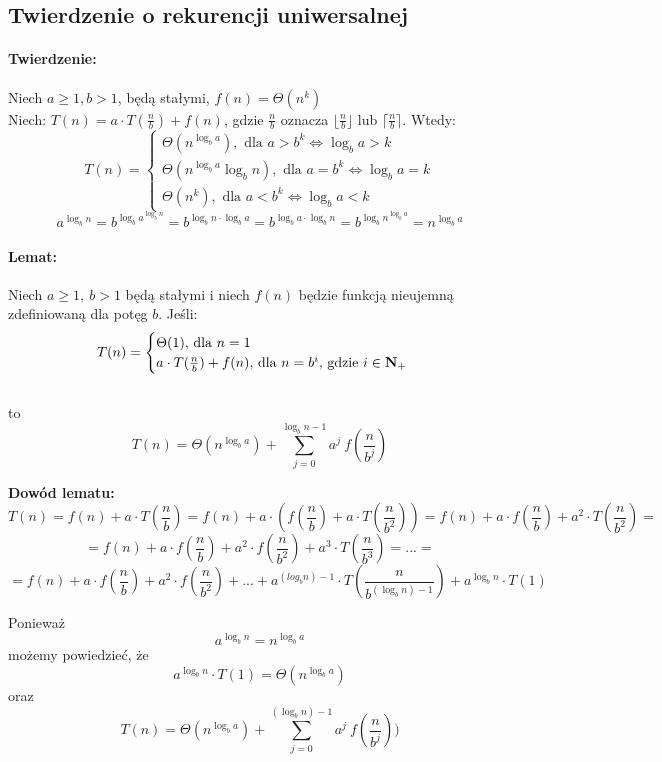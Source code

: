 \subsection{Twierdzenie o rekurencji uniwersalnej}
\paragraph{Twierdzenie:}
Niech $a \geq 1, b > 1$, będą stałymi, $f(n) = \Theta(n^k)$\\
Niech: $T(n) = a \cdot T(\frac{n}{b})+f(n)$, gdzie $\frac{n}{b}$ oznacza $\lfloor \frac{n}{b} \rfloor $ lub $\lceil \frac{n}{b} \rceil$. Wtedy:
$$
  T(n)=\begin{cases}
               \Theta(n^{\log_b a}), \text{ dla } a > b^k \Leftrightarrow \log_b a>k\\
               \Theta(n^{\log_b a} \log_b n), \text{ dla } a=b^k \Leftrightarrow \log_b a=k\\
               \Theta(n^k), \text{ dla } a<b^k \Leftrightarrow \log_b a<k
		\end{cases}
$$
$$a^{\log_b n}=b^{\log_b a^{\log_b n}}=b^{\log_b n \cdot \log_b a}=b^{\log_b a \cdot \log_b n}=b^{\log_b n^{\log_b a}}=n^{\log_b a}$$

\paragraph{Lemat: }Niech $a\geq 1,\ b>1$ będą stałymi i niech $f(n)$ będzie funkcją nieujemną zdefiniowaną dla potęg $b$.
Jeśli: 
\[
T(n)=\begin{cases}
	\Theta(1), $ dla $ n=1 \\
    a \cdot T(\frac{n}{b}) + f(n),$ dla $ n=b^i, $ gdzie $i \in \mathbf{N}_+
\end{cases}
\]\\
to\
$$T(n) = \Theta(n^{\log_b a}) + \sum_{j=0}^{\log_b n-1} a^j\ f(\frac{n}{b^j})$$

\textbf{Dowód lematu: }
$$T(n)= f(n) + a \cdot T(\frac{n}{b})= f(n) + a \cdot (f(\frac{n}{b}) + a  \cdot T(\frac{n}{b^2})) = f(n) + a \cdot f(\frac{n}{b}) + a^2 \cdot T(\frac{n}{b^2}) = $$
$$= f(n) + a \cdot f(\frac{n}{b}) + a^2 \cdot f(\frac{n}{b^2}) + a^3  \cdot T(\frac{n}{b^3}) = ... =$$
$$= f(n) + a \cdot f(\frac{n}{b}) + a^2 \cdot f(\frac{n}{b^2}) + ... + a^{(log_b n)-1} \cdot T(\frac{n}{b^{(\log_b n) - 1}}) + a^{\log_b n} \cdot T(1)$$

Ponieważ $$a^{\log_b n}=n^{\log_b a}$$ możemy powiedzieć, że $$a^{\log_b n} \cdot T(1) = \Theta(n^{\log_b a})$$
oraz $$T(n) = \Theta(n^{\log_b a})+\sum_{j=0}^{(\log_b n)-1} a^j\ f(\frac{n}{b^j}))$$

